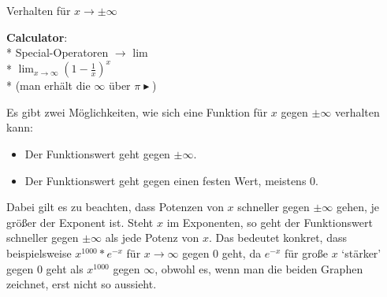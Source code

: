 \begin{bla}{Verhalten für $x\rightarrow \pm \infty$}
  \begin{marginfigure}
    \begin{tcolorbox}[colback=white!95!black,colframe=white!75!black,title=CAS:,arc=0mm]
      \begin{scriptsize}
        \textbf{Calculator}: \\*
        Special-Operatoren \( \to \) lim \\*
        \hfill \( \lim_{x \to \infty} {\left( 1- \tfrac{1}{x} \right)}^x \) \\*
        (man erhält die \( \infty \) über \( \pi \blacktriangleright \))
      \end{scriptsize}
    \end{tcolorbox}
  \end{marginfigure}
  \begin{marginfigure}
      \caption{$f(x)=e^{-x}$ geht für $x\rightarrow\infty$ gegen $0$.}
    \end{marginfigure}
  Es gibt zwei Möglichkeiten, wie sich eine Funktion für $x$ gegen $\pm \infty$ verhalten kann:
  \begin{itemize}
    \item Der Funktionswert geht gegen $\pm \infty$.
    \item Der Funktionswert geht gegen einen festen Wert, meistens $0$.
  \end{itemize}
  Dabei gilt es zu beachten, dass Potenzen von $x$ schneller gegen $\pm \infty$ gehen, je größer der Exponent ist. Steht $x$ im Exponenten, so geht der Funktionswert schneller gegen $\pm \infty$ als jede Potenz von $x$. Das bedeutet konkret, dass beispielsweise $x^{1000}*e^{-x}$ für $x \rightarrow \infty$ gegen $0$ geht, da $e^{-x}$ für große $x$ `stärker' gegen $0$ geht als $x^{1000}$ gegen $\infty$, obwohl es, wenn man die beiden Graphen zeichnet, erst nicht so aussieht.
\end{bla}



